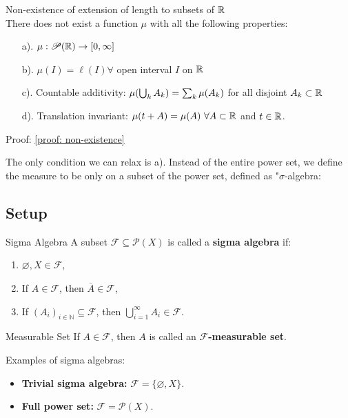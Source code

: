 \begin{prop}{Non-existence of extension of length to  subsets of ${\mathbb{R}}$}\\
	There does not exist a function $\mu$ with all the following properties:
	\begin{enumerate}
		\item [a).] $\mu: \mathscr{P}({\mathbb{R}})\rightarrow [0, \infty]$
		\item [b).]$\mu(I) = \ell(I) \forall$ open interval $I$ on ${\mathbb{R}}$
		\item [c).] Countable additivity: $\mu\qty(\bigcup_k A_k) = \sum_k \mu(A_k)$ for all disjoint $A_k\subset {\mathbb{R}}$
		\item [d).]Translation invariant: $\mu(t+A) = \mu(A) \ \forall A\subset {\mathbb{R}}$ and $t\in {\mathbb{R}}$. 
	\end{enumerate}
	Proof: \ref{proof: non-existence}
\end{prop}

\noindent The only condition we can relax is a). Instead of the entire power set, we define the measure to be only on a subset of the power set, defined as "$\sigma$-algebra: 

\subsection{Setup}
\begin{thm}{Sigma Algebra}
A subset \(\mathscr{F} \subseteq \mathscr{P}(X)\) is called a \textbf{sigma algebra} if:
\begin{enumerate}
    \item \(\varnothing, X \in \mathscr{F}\),
    \item If \(A \in \mathscr{F}\), then \(\overline A \in \mathscr{F}\),
    \item If \((A_i)_{i \in \mathbb{N}} \subseteq \mathscr{F}\), then \(\bigcup_{i=1}^\infty A_i \in \mathscr{F}\).
\end{enumerate}
\end{thm}

\begin{df}{Measurable Set}
If \(A \in \mathscr{F}\), then \(A\) is called an \textbf{\(\mathscr{F}\)-measurable set}.
\end{df}

\begin{rmk}
Examples of sigma algebras:
\begin{itemize}
    \item \textbf{Trivial sigma algebra:} \(\mathscr{F} = \{\varnothing, X\}\).
    \item \textbf{Full power set:} \(\mathscr{F} = \mathscr{P}(X)\).
\end{itemize}
\end{rmk}



